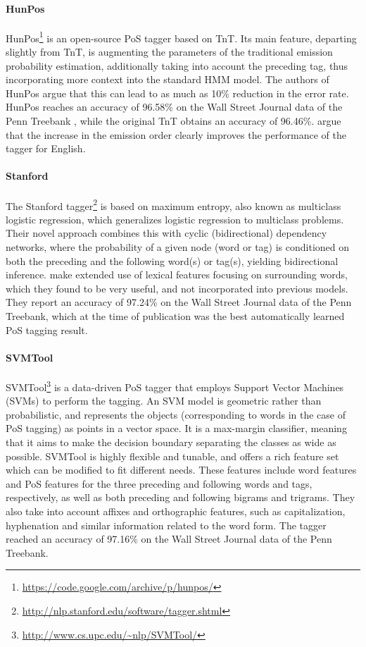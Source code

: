 \documentclass[a4paper,12pt,english]{book}
\begin{document}
\paragraph{HunPos}
HunPos\footnote{\url{https://code.google.com/archive/p/hunpos/}}
\cite{Hal:Kor:Ora:07} is an open-source PoS tagger based on TnT. Its main
feature, departing slightly from TnT, is augmenting the parameters of the
traditional emission probability estimation, additionally taking into account
the preceding tag, thus incorporating more context into the standard HMM model.
The authors of HunPos argue that this can lead to as much as 10\% reduction in
the error rate. HunPos reaches an accuracy of 96.58\% on the Wall Street
Journal data of the Penn Treebank \cite{Mar:San:Mar:93}, while the original TnT
obtains an accuracy of 96.46\%.  argue that the increase
in the emission order clearly improves the performance of the tagger for
English.

\paragraph{Stanford}
The Stanford
tagger\footnote{\url{http://nlp.stanford.edu/software/tagger.shtml}}
\cite{Tou:Kle:Man:03} is based on maximum entropy, also known as multiclass
logistic regression, which generalizes logistic regression to multiclass
problems. Their novel approach combines this with cyclic (bidirectional)
dependency networks, where the probability of a given node (word or tag) is
conditioned on both the preceding and the following word(s) or tag(s), yielding
bidirectional inference.  make extended use of lexical
features focusing on surrounding words, which they found to be very useful, and
not incorporated into previous models. They report an accuracy of 97.24\% on
the Wall Street Journal data of the Penn Treebank, which at the time of
publication was the best automatically learned PoS tagging result.

\paragraph{SVMTool}
SVMTool\footnote{\url{http://www.cs.upc.edu/~nlp/SVMTool/}} \cite{Gim:Mar:04}
is a data-driven PoS tagger that employs Support
Vector Machines (SVMs) to perform the tagging. An SVM model is geometric rather
than probabilistic, and represents the objects (corresponding to words in the
case of PoS tagging) as points in a vector space. It is a max-margin
classifier, meaning that it aims to make the decision boundary separating the
classes as wide as possible. SVMTool is highly flexible and tunable, and offers
a rich feature set which can be modified to fit different needs. These features
include word features and PoS features for the three preceding and following
words and tags, respectively, as well as both preceding and following bigrams
and trigrams. They also take into account affixes and orthographic features,
such as capitalization, hyphenation and similar information related to the word
form. The tagger reached an accuracy of 97.16\% on the Wall Street Journal data
of the Penn Treebank.
\end{document}
